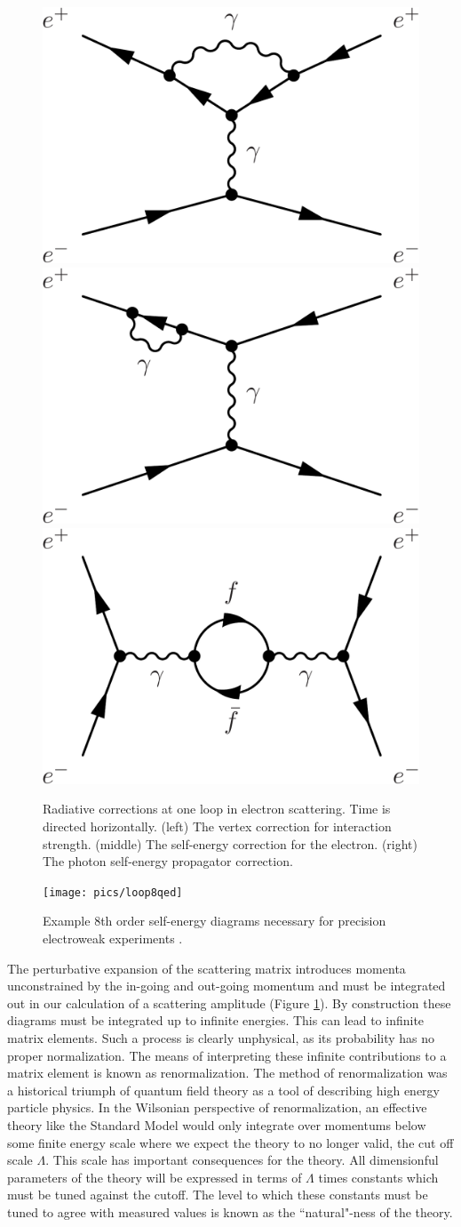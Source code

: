 \begin{figure}
\begin{center}
\includegraphics[width=.3\textwidth]{pics/vertex_correction}
\includegraphics[width=.3\textwidth]{pics/self_energy}
\includegraphics[width=.3\textwidth]{pics/mass_correction}
\end{center}
\caption{Radiative corrections at one loop in electron scattering. Time is directed horizontally. (left) The vertex correction for interaction strength. 
(middle) The self-energy correction for the electron. (right)   
The photon self-energy propagator correction.}
\label{fig:one_loop}
\end{figure}


\begin{figure}
\begin{center}
\texttt{[image: pics/loop8qed]}
\end{center}
\caption{Example 8th order self-energy diagrams necessary for precision electroweak experiments \cite{loop8qed}.}
\label{fig:loop8qed}
\end{figure}

The perturbative expansion of the scattering matrix introduces momenta unconstrained by the in-going and out-going momentum
and must be integrated out in our calculation of a scattering amplitude (Figure \ref{fig:one_loop}). By construction  
these diagrams must be integrated up to infinite energies. This can lead to infinite matrix elements. 
Such a process is clearly unphysical, as its probability has no proper normalization. The
means of interpreting these infinite contributions to a matrix element is known as renormalization. The method of 
renormalization was a historical triumph of quantum field theory as a tool of describing high energy particle physics.
In the Wilsonian perspective of renormalization, an effective theory like the Standard Model would only integrate
over momentums below some finite energy scale where we expect the theory to no longer valid, the cut off scale $\Lambda$. This
scale has important consequences for the theory. All dimensionful parameters of the theory will be expressed in
terms of $\Lambda$ times constants which must be tuned against the cutoff. The level to which these constants must
be tuned to agree with measured values is known as the ``natural"-ness of the theory. 

